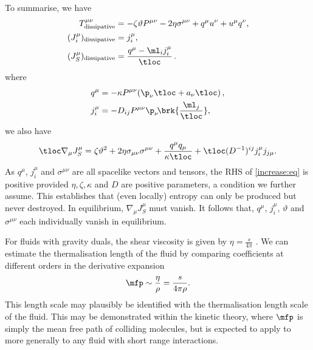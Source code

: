 To summarise, we have
%
\begin{equation}\label{extraTvisc:eq}
\begin{split}
  T^{\mu\nu}_\mathrm{dissipative} &= -\zeta \vartheta P^{\mu\nu} -
  2\eta\sigma^{\mu\nu} + q^\mu u^\nu + u^\mu q^\nu,\\
 (J^\mu_i)_\mathrm{dissipative} &= j^\mu_{i},\\
 (J^\mu_S)_\mathrm{dissipative} &= \frac{q^\mu-\ml_i j^\mu_{i}}{\tloc}\,.
\end{split}
\end{equation}
%
where
%
\begin{equation}\label{heatdiffusion:eq}
\begin{split}
 q^\mu &= -\kappa P^{\mu\nu} (\p_\nu\tloc + a_\nu\tloc)\,,
 \\
 j^\mu_{i}
    &= - D_{ij} P^{\mu\nu}\p_\nu\! \brk{\frac{\ml_j}{\tloc}},
\end{split}
\end{equation}
%
we also have
%
\begin{equation}\label{increase:eq}
 \tloc\nabla_\mu J^\mu_S = \zeta \vartheta ^2
  + 2 \eta \sigma_{\mu \nu} \sigma^{\mu \nu}
  + \frac{q^\mu q_\mu}{\kappa\tloc}
  + \tloc (D^{-1})^{ij} j^\mu_i j_{j\mu} .
\end{equation}
%
As $q^\mu$, $j^\mu_i$ and $\sigma^{\mu \nu}$ are all spacelike
vectors and tensors, the RHS of \eqref{increase:eq} is positive provided
$\eta, \zeta, \kappa$ and $D$ are positive parameters, a condition we further assume. This establishes that (even locally) entropy can only be produced but never destroyed. In equilibrium, $\nabla_\mu J^\mu_S$ must vanish. It follows that, $q^\mu$, $j^\mu_i$, $\vartheta$ and $\sigma^{\mu \nu}$
each individually vanish in equilibrium.

For fluids with gravity duals, the shear viscosity is given by $\eta=\frac{s}{4\pi}$ \cite{Son:2007vk}. We can estimate the thermalisation length of the fluid by comparing coefficients at different orders in the derivative expansion
%
\begin{equation}\label{mfp:eq}
  \mfp \sim \frac{\eta}{\rho} = \frac{s}{4\pi\rho}.
\end{equation}
%
This length scale may plausibly be identified with the thermalisation length scale of the fluid. This may be demonstrated within the kinetic theory, where $\mfp$ is simply the mean free path of colliding molecules, but is expected to apply to more generally to any fluid with short range interactions.

